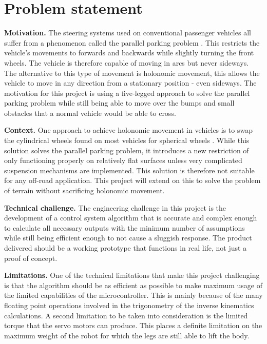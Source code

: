 
\section{Problem statement}

\textbf{Motivation.}
The steering systems used on conventional passenger vehicles all suffer from a phenomenon called the parallel parking problem \cite{parallel:1}. This restricts the vehicle's movements to forwards and backwards while slightly turning the front wheels. The vehicle is therefore capable of moving in arcs but never sideways. The alternative to this type of movement is holonomic movement, this allows the vehicle to move in any direction from a stationary position - even sideways.  The motivation for this project is using a five-legged approach to solve the parallel parking problem while still being able to move over the bumps and small obstacles that a normal vehicle would be able to cross.

\textbf{Context.}
One approach to achieve holonomic movement in vehicles is to swap the cylindrical wheels found on most vehicles for spherical wheels \cite{Omni:1}. While this solution solves the parallel parking problem, it introduces  a new restriction of only functioning properly on relatively flat surfaces unless very complicated suspension mechanisms are implemented. This solution is therefore not suitable for any off-road application. This project will extend on this to solve the problem of terrain without sacrificing holonomic movement.

\textbf{Technical challenge.}
The engineering challenge in this project is the development of a control system algorithm that is accurate and complex enough to calculate all necessary outputs with the minimum number of assumptions while still being efficient enough to not cause a sluggish response. The product delivered should be a working prototype that functions in real life, not just a proof of concept.

\textbf{Limitations.}
One of the technical limitations that make this project challenging is that the algorithm should be as efficient as possible to make maximum usage of the limited capabilities of the microcontroller. This is mainly because of the many floating point operations involved in the trigonometry of the inverse kinematics calculations. A second limitation to be taken into consideration is the limited torque that the servo motors can produce. This places a definite limitation on the maximum weight of the robot for which the legs are still able to lift the body. 



